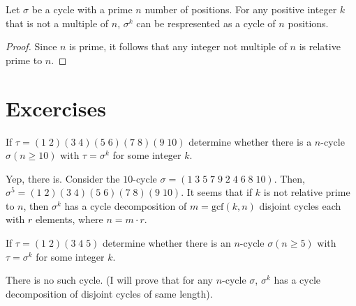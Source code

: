 \documentclass[12pt]{article}
\newenvironment{problem}[2][Problem]{\begin{trivlist} \item[\hskip \labelsep {\bfseries #1}\hskip \labelsep {\bfseries #2.}]}{\end{trivlist}}
\newenvironment{corollary}[2][Corollary]{\begin{trivlist} \item[\hskip \labelsep {\bfseries #1}\hskip \labelsep {\bfseries #2.}]}{\end{trivlist}}
\newenvironment{solution}[1][Solution]{\begin{trivlist} \item[\hskip \labelsep {\bfseries #1}]}{\end{trivlist}}
\begin{document}
\begin{corollary}{a1}
  Let $\sigma$ be a cycle with a prime $n$ number of positions. For any positive integer $k$ that is not a multiple of $n$, $\sigma^{k}$ can be respresented as a cycle of $n$ positions.
  \begin{proof}
    Since $n$ is prime, it follows that any integer not multiple of $n$ is relative prime to $n$.                                            
  \end{proof}
\end{corollary}
\section{Excercises}
\begin{problem}{12}
\begin{enumerate}
 \item If $\tau = (1\; 2)(3\; 4)(5\; 6)(7\; 8)(9\; 10)$ determine whether there is a $n$-cycle $\sigma (n\geq 10)$ with $\tau = \sigma^{k}$ for some integer $k$.
\begin{solution}
  Yep, there is. Consider the $10$-cycle $\sigma = (1\; 3\; 5\; 7\; 9\; 2\; 4\; 6\; 8\; 10)$. Then, $\sigma^{5} = (1\; 2) (3\; 4) (5\; 6) (7\; 8) (9\; 10)$. It seems that if $k$ is not relative prime to $n$, then $\sigma^{k}$ has a cycle decomposition of $m=\text{gcf}(k,n)$ disjoint cycles each with $r$ elements, where $n=m\cdot r$.
\end{solution}
  \item If $\tau = (1\;2)(3\;4\;5)$ determine whether there is an $n$-cycle $\sigma (n\geq 5)$ with $\tau = \sigma^{k}$ for some integer $k$. 
\begin{solution}
  There is no such cycle. (I will prove that for any $n$-cycle $\sigma$, $\sigma^{k}$ has a cycle decomposition of disjoint cycles of same length).
\end{solution}
\end{enumerate}
\end{problem}
\end{document}
